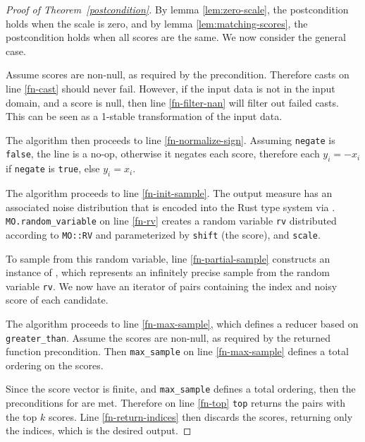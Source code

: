 \documentclass{article}
\begin{document}
\begin{proof}[Proof of Theorem~\ref{postcondition}]
    By lemma \ref{lem:zero-scale}, the postcondition holds when the scale is zero,
    and by lemma \ref{lem:matching-scores}, the postcondition holds when all scores are the same.
    We now consider the general case.

    Assume scores are non-null, as required by the precondition.
    Therefore casts on line \ref{fn-cast} should never fail.
    However, if the input data is not in the input domain, and a score is null,
    then line \ref{fn-filter-nan} will filter out failed casts.
    This can be seen as a 1-stable transformation of the input data.

    The algorithm then proceeds to line \ref{fn-normalize-sign}.
    Assuming \texttt{negate} is \texttt{false}, the line is a no-op, otherwise it negates each score,
    therefore each $y_i = -x_i$ if \texttt{negate} is \texttt{true}, else $y_i = x_i$.

    The algorithm proceeds to line \ref{fn-init-sample}.
    The output measure has an associated noise distribution that is encoded into the Rust type system via
    .
    \texttt{MO.random\_variable} on line \ref{fn-rv} creates a random variable \texttt{rv}
    distributed according to \texttt{MO::RV} and parameterized by \texttt{shift} (the score), and \texttt{scale}.

    To sample from this random variable, line \ref{fn-partial-sample} constructs an instance of
    ,
    which represents an infinitely precise sample from the random variable \texttt{rv}.
    We now have an iterator of pairs containing the index and noisy score of each candidate.

    The algorithm proceeds to line \ref{fn-max-sample},
    which defines a reducer based on \texttt{greater\_than}.
    Assume the scores are non-null, as required by the returned function precondition.
    Then \texttt{max\_sample} on line \ref{fn-max-sample} defines a total ordering on the scores.

    Since the score vector is finite, and \texttt{max\_sample} defines a total ordering,
    then the preconditions for  are met.
    Therefore on line \ref{fn-top} \texttt{top} returns the pairs with the top $k$ scores.
    Line \ref{fn-return-indices} then discards the scores, returning only the indices,
    which is the desired output.


\end{proof}
\end{document}

